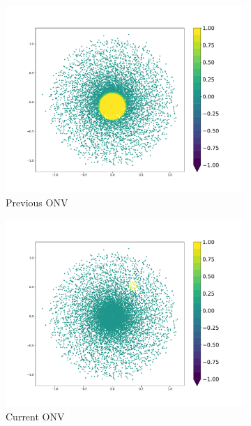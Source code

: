 \documentclass [MS] {UCLAthesis}
\begin{document}
\begin{figure}
    \centering
    \begin{subfigure}{0.49\textwidth}
        \centering
        \includegraphics[width=\textwidth]{onv_normal_prev}
        \caption{Previous ONV}
        \label{fig:onv_prev}
    \end{subfigure}
    \hfill
    \begin{subfigure}{0.49\textwidth}
        \centering
        \includegraphics[width=\textwidth]{onv_normal_cur}
        \caption{Current ONV}
        \label{fig:onv_cur}
    \end{subfigure}
    \hfill
    \begin{subfigure}{0.49\textwidth}

\end{subfigure}
\end{figure}
\end{document}
